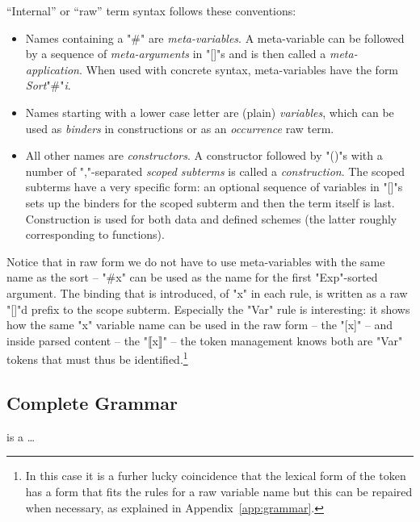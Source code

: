 \documentclass[11pt]{article} %
\begin{document}
\begin{notation}\label{nota:raw}
  ``Internal'' or ``raw'' term syntax follows these conventions:
  \begin{itemize}

  \item Names containing a "#" are \emph{meta-variables}. A meta-variable can be followed by a
    sequence of \emph{meta-arguments} in "[]"s and is then called a \emph{meta-application}.  When
    used with concrete syntax, meta-variables have the form \emph{Sort}"#"\emph{i}.

  \item Names starting with a lower case letter are (plain) \emph{variables}, which can be used as
    \emph{binders} in constructions or as an \emph{occurrence} raw term.

  \item All other names are \emph{constructors}.  A constructor followed by "()"s with a number of
    ","-separated \emph{scoped subterms} is called a \emph{construction}.  The scoped subterms have
    a very specific form: an optional sequence of variables in "[]"s sets up the binders for the
    scoped subterm and then the term itself is last.  Construction is used for both data and defined
    schemes (the latter roughly corresponding to functions).

  \end{itemize}
\end{notation}

Notice that in raw form we do not have to use meta-variables with the same name as the sort -- "#x"
can be used as the name for the first "Exp"-sorted argument. The binding that is introduced, of "x"
in each rule, is written as a raw "[]"d prefix to the scope subterm. Especially the "Var" rule is
interesting: it shows how the same "x" variable name can be used in the raw form -- the "[x]" -- and
inside parsed content -- the "⟦x⟧" -- the token management knows both are "Var" tokens that must
thus be identified.\footnote{In this case it is a furher lucky coincidence that the lexical form of
  the token has a form that fits the \HAX rules for a raw variable name but this can be repaired
  when necessary, as explained in Appendix~\ref{app:grammar}.}


\subsection{Complete Grammar}

\HAX is a \HAX…



\normalsize

\end{document}
